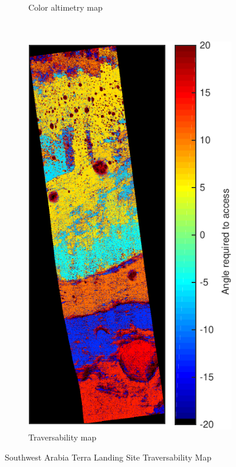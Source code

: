 \documentclass[12pt]{article}
\begin{document}
\begin{figure}[h!]
\begin{subfigure}[t]{0.27\textwidth}
    \caption{Color altimetry map}
    \label{fig:southwest_dtm}
  \end{subfigure}
  ~
  \begin{subfigure}[t]{0.27\textwidth}
    \centering
    \includegraphics[height=0.4\paperheight]{figures/maps/ESP_011844_1855/DTEEC_011844_1855_002812_1855_A01-traversability_map.pdf}
    \caption{Traversability map}
    \label{fig:southwest_traversability}
  \end{subfigure}
  \caption{Southwest Arabia Terra Landing Site Traversability Map}
  \label{fig:southwest}
\end{figure}
\end{document}
